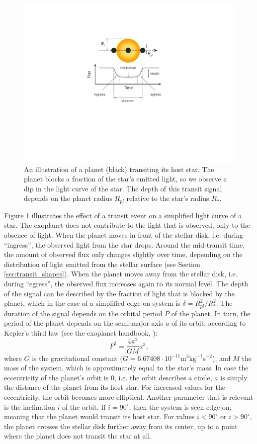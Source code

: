 \begin{figure}
    \centering
    \includegraphics[width=0.4\linewidth]{Background/Figures/transit_drawing.pdf}
    \caption{An illustration of a planet (black) transiting its host star. The planet blocks a fraction of the star's emitted light, so we observe a dip in the light curve of the star. The depth of this transit signal depends on the planet radius $R_{pl}$ relative to the star's radius $R_*$.}
    \label{fig:transit}
\end{figure}

Figure \ref{fig:transit} illustrates the effect of a transit event on a simplified light curve of a star. The exoplanet does not contribute to the light that is observed, only to the absence of light. When the planet moves in front of the stellar disk, i.e. during ``ingress'', the observed light from the star drops. Around the mid-transit time, the amount of observed flux only changes slightly over time, depending on the distribution of light emitted from the stellar surface (see Section \ref{sec:transit_shapes}). When the planet moves away from the stellar disk, i.e. during ``egress'', the observed flux increases again to its normal level. The depth of the signal can be described by the fraction of light that is blocked by the planet, which in the case of a simplified edge-on system is $\delta = R_{pl}^2 / R_*^2$. The duration of the signal depends on the orbital period $P$ of the planet. In turn, the period of the planet depends on the semi-major axis $a$ of its orbit, according to Kepler's third law (see the exoplanet handbook, \citealp{perryman2018exoplanet}):
\begin{equation}
    \label{eq:kepler}
    P^2 = \frac{4 \pi^2}{GM}  a^3,
\end{equation}
where $G$ is the gravitational constant ($G=6.67408 \cdot 10^{-11} \text{m}^3 \text{kg}^{-1} \text{s}^{-2}$), and $M$ the mass of the system, which is approximately equal to the star’s mass.
In case the eccentricity of the planet's orbit is 0, i.e. the orbit describes a circle, $a$ is simply the distance of the planet from its host star. For increased values for the eccentricity, the orbit becomes more elliptical. Another parameter that is relevant is the inclination $i$ of the orbit. If $i=90^\circ$, then the system is seen edge-on, meaning that the planet would transit its host star. For values $i < 90^\circ$ or $i > 90^\circ$, the planet crosses the stellar disk further away from its center, up to a point where the planet does not transit the star at all.

